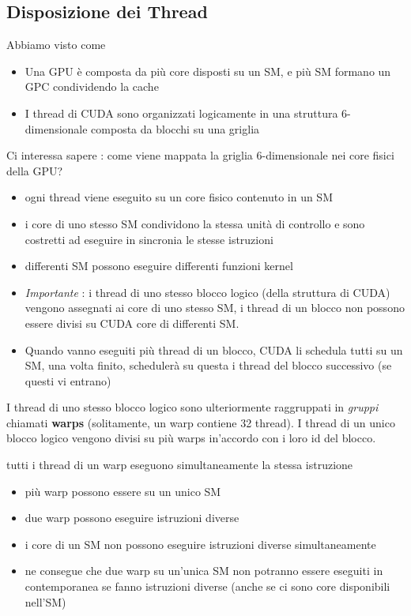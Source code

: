 \documentclass[10pt, letterpaper]{report}
\begin{document}
\subsection{Disposizione dei Thread}
Abbiamo visto come \begin{itemize}
   \item Una GPU è composta da più core disposti su un SM, e più SM formano un GPC condividendo la cache
   \item I thread di CUDA sono organizzati logicamente in una struttura 6-dimensionale composta da blocchi su una griglia
\end{itemize}
Ci interessa sapere : come viene mappata la griglia 6-dimensionale nei core fisici della GPU?\begin{itemize}
    \item ogni thread viene eseguito su un core fisico contenuto in un SM 
    \item i core di uno stesso SM condividono la stessa unità di controllo e sono costretti ad eseguire in sincronia le stesse istruzioni 
    \item differenti SM possono eseguire differenti funzioni kernel 
    \item \textit{Importante} : i thread di uno stesso blocco logico (della struttura di CUDA) vengono assegnati ai core di uno stesso SM, i thread di un blocco non possono essere divisi su CUDA core di differenti SM. 
    \item Quando vanno eseguiti più thread di un blocco, CUDA li schedula tutti su un SM, una volta finito, schedulerà su questa i thread del blocco successivo (se questi vi entrano)
\end{itemize}
I thread di uno stesso blocco logico sono ulteriormente raggruppati in \textit{gruppi} chiamati \textbf{warps} (solitamente, un warp contiene 32 thread). I thread di un unico blocco logico vengono divisi su più warps in'accordo con i loro id del blocco. \begin{center}
    tutti i thread di un warp eseguono simultaneamente la stessa istruzione
\end{center}\begin{itemize}
    \item più warp possono essere su un unico SM 
    \item due warp possono eseguire istruzioni diverse 
    \item i core di un SM non possono eseguire istruzioni diverse simultaneamente 
    \item ne consegue che due warp su un'unica SM non potranno essere eseguiti in contemporanea se fanno istruzioni diverse (anche se ci sono core disponibili nell'SM)
\end{itemize}
\end{document}
